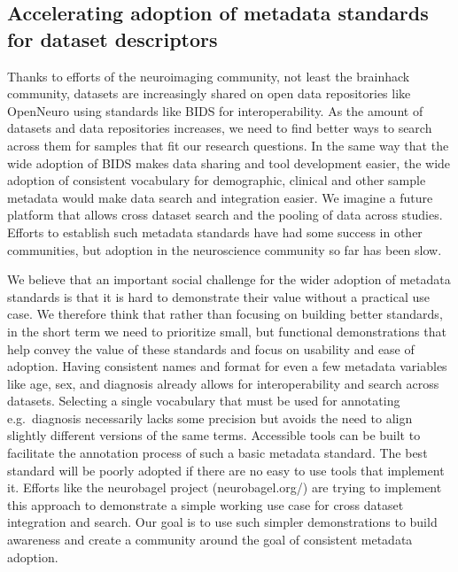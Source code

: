 \documentclass[../main.tex]{subfiles}
\begin{document}
\subsection{Accelerating adoption of metadata standards for dataset descriptors}



Thanks to efforts of the neuroimaging community, not least the brainhack community\supercite{Gau2021}, datasets are increasingly shared on open data repositories like OpenNeuro\supercite{Markiewicz2021-bf} using standards like BIDS\supercite{Gorgolewski2016} for interoperability. As the amount of datasets and data repositories increases, we need to find better ways to search across them for samples that fit our research questions. In the same way that the wide adoption of BIDS makes data sharing and tool development easier, the wide adoption of consistent vocabulary for demographic, clinical and other sample metadata would make data search and integration easier. We imagine a future platform that allows cross dataset search and the pooling of data across studies. Efforts to establish such metadata standards have had some success in other communities\supercite{Field2008-kw, Stang2010-nl}, but adoption in the neuroscience community so far has been slow. 

We believe that an important social challenge for the wider adoption of metadata standards is that it is hard to demonstrate their value without a practical use case. We therefore think that rather than focusing on building better standards, in the short term we need to prioritize small, but functional demonstrations that help convey the value of these standards and focus on usability and ease of adoption. Having consistent names and format for even a few metadata variables like age, sex, and diagnosis already allows for interoperability and search across datasets. Selecting a single vocabulary that must be used for annotating e.g.\ diagnosis necessarily lacks some precision but avoids the need to align slightly different versions of the same terms. Accessible tools can be built to facilitate the annotation process of such a basic metadata standard. The best standard will be poorly adopted if there are no easy to use tools that implement it. Efforts like the neurobagel project (neurobagel.org/) are trying to implement this approach to demonstrate a simple working use case for cross dataset integration and search. Our goal is to use such simpler demonstrations to build awareness and create a community around the goal of consistent metadata adoption.
\end{document}
